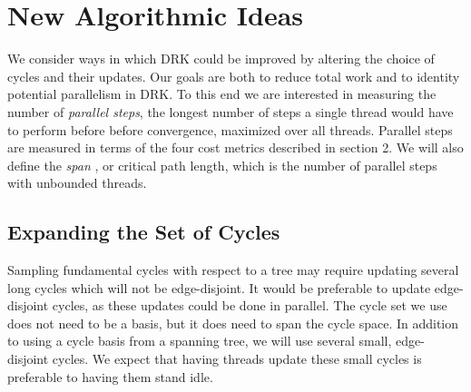 \documentclass{sig-alternate}
\begin{document}
\section{New Algorithmic Ideas}
We consider ways in which DRK could be improved by
altering the choice of cycles and their updates.
Our goals are both to reduce total work and to identity
potential parallelism in DRK. To this end
we are interested in measuring the number of
\textit{parallel steps}, the longest number of steps a single
thread would have to perform before before convergence,
maximized over all threads.
Parallel steps are measured in terms of the four cost metrics
described in section 2.
We will also define
the \textit{span} \cite{CLRS2009},
or critical path length, which is the number
of parallel steps with unbounded threads.

\subsection{Expanding the Set of Cycles}
Sampling fundamental cycles with respect to a tree may require updating several
long cycles which will not be edge-disjoint. It would be preferable to update
edge-disjoint cycles, as these updates could be done in
parallel.
The cycle set we use does not need to be a basis, but it does need to
span the cycle space.
In addition to using a cycle basis from a spanning tree, we will use
several small, edge-disjoint cycles. We expect that having threads update these
small cycles is preferable to having them stand idle.
\end{document}
